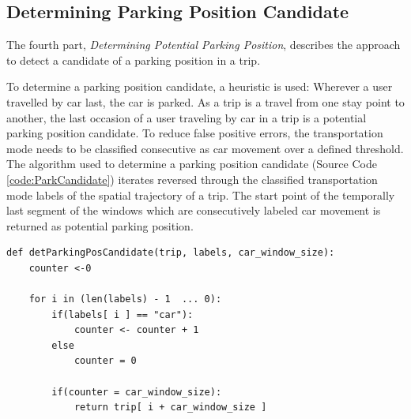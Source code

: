 \subsection{Determining Parking Position Candidate}
The fourth part, \textit{Determining Potential Parking Position}, describes the approach to detect a candidate of a parking position in a trip. 

To determine a parking position candidate, a heuristic is used: Wherever a user travelled by car last, the car is parked. As a trip is a travel from one stay point to another, the last occasion of a user traveling by car in a trip is a potential parking position candidate. To reduce false positive errors, the transportation mode needs to be classified consecutive as car movement over a defined threshold. The algorithm used to determine a parking position candidate (Source Code \ref{code:ParkCandidate}) iterates reversed through the classified transportation mode labels of the spatial trajectory of a trip. The start point of the temporally last segment of the windows which are consecutively labeled car movement is returned as potential parking position. 

\begin{lstlisting}[style=py, caption={Pseudocode: Determine Parking Position Candidate}, label={code:ParkCandidate}]
def detParkingPosCandidate(trip, labels, car_window_size):
    counter <-0
    
    for i in (len(labels) - 1  ... 0):
        if(labels[ i ] == "car"):
            counter <- counter + 1
        else
            counter = 0
        
        if(counter = car_window_size):
            return trip[ i + car_window_size ]
   
\end{lstlisting}









